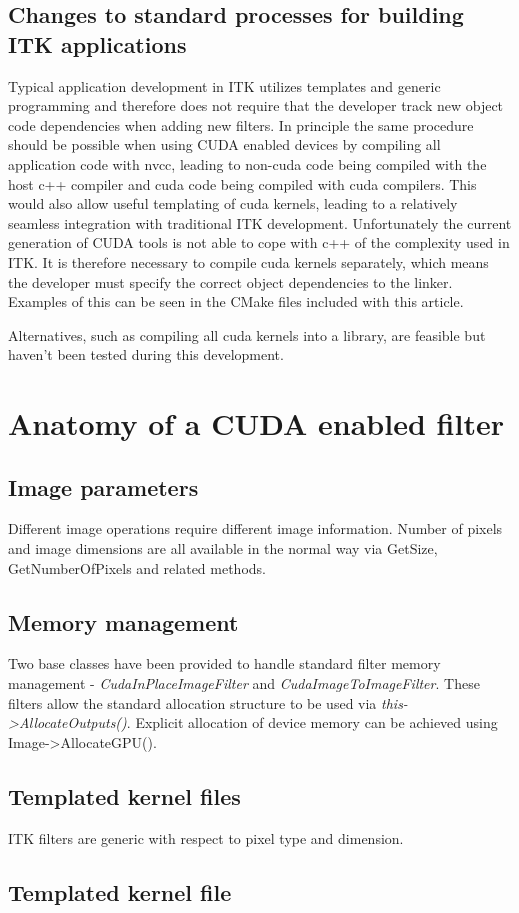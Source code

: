\documentclass{InsightArticle}
\begin{document}
\subsection{Changes to standard processes for building ITK applications}
Typical application development in ITK utilizes templates and generic
programming and therefore does not require that the developer track
new object code dependencies when adding new filters. In principle the
same procedure should be possible when using CUDA enabled devices by
compiling all application code with nvcc, leading to non-cuda code
being compiled with the host c++ compiler and cuda code being compiled
with cuda compilers. This would also allow useful templating of cuda
kernels, leading to a relatively seamless integration with traditional
ITK development. Unfortunately the current generation of CUDA tools is
not able to cope with c++ of the complexity used in ITK. It is
therefore necessary to compile cuda kernels separately, which means
the developer must specify the correct object dependencies to the
linker. Examples of this can be seen in the CMake files included with
this article.

Alternatives, such as compiling all cuda kernels into a library, are
feasible but haven't been tested during this development.

\section{Anatomy of a CUDA enabled filter}
\subsection{Image parameters}
Different image operations require different image information. Number
of pixels and image dimensions are all available in the normal way via
GetSize, GetNumberOfPixels and related methods.

\subsection{Memory management}

Two base classes have been provided to handle standard filter memory
management - {\em CudaInPlaceImageFilter} and {\em
CudaImageToImageFilter}. These filters allow the standard allocation
structure to be used via {\em this->AllocateOutputs()}. Explicit
allocation of device memory can be achieved using
Image->AllocateGPU().

\subsection{Templated kernel files}
ITK filters are generic with respect to pixel type and dimension.



\subsection{Templated kernel file}



%

\nocite{ITKSoftwareGuide}
\end{document}
